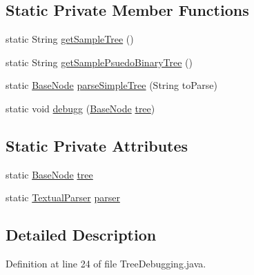 \subsection*{Static Private Member Functions}
\begin{DoxyCompactItemize}
\item 
static String \hyperlink{classit_1_1emarolab_1_1cagg_1_1example_1_1TreeDebugging_a145e45cdc8d527a15647e0e1ba5307e2}{get\-Sample\-Tree} ()
\item 
static String \hyperlink{classit_1_1emarolab_1_1cagg_1_1example_1_1TreeDebugging_a3d2681b01453c7850c0bf8c10d97eab8}{get\-Sample\-Psuedo\-Binary\-Tree} ()
\item 
static \hyperlink{classit_1_1emarolab_1_1cagg_1_1core_1_1BaseNode}{Base\-Node} \hyperlink{classit_1_1emarolab_1_1cagg_1_1example_1_1TreeDebugging_a41d947d676cc11aa5db4c63073d41296}{parse\-Simple\-Tree} (String to\-Parse)
\item 
static void \hyperlink{classit_1_1emarolab_1_1cagg_1_1example_1_1TreeDebugging_af0fc9a007516ebce847a9336f4ab77cd}{debugg} (\hyperlink{classit_1_1emarolab_1_1cagg_1_1core_1_1BaseNode}{Base\-Node} \hyperlink{classit_1_1emarolab_1_1cagg_1_1example_1_1TreeDebugging_ad17bda07d36ff0e0c23d4f061e24e0e8}{tree})
\end{DoxyCompactItemize}
\subsection*{Static Private Attributes}
\begin{DoxyCompactItemize}
\item 
static \hyperlink{classit_1_1emarolab_1_1cagg_1_1core_1_1BaseNode}{Base\-Node} \hyperlink{classit_1_1emarolab_1_1cagg_1_1example_1_1TreeDebugging_ad17bda07d36ff0e0c23d4f061e24e0e8}{tree}
\item 
static \hyperlink{classit_1_1emarolab_1_1cagg_1_1core_1_1language_1_1parser_1_1TextualParser}{Textual\-Parser} \hyperlink{classit_1_1emarolab_1_1cagg_1_1example_1_1TreeDebugging_a3e1949f5e3c06df44046684ecbd19fd9}{parser}
\end{DoxyCompactItemize}


\subsection{Detailed Description}


Definition at line 24 of file Tree\-Debugging.\-java.



